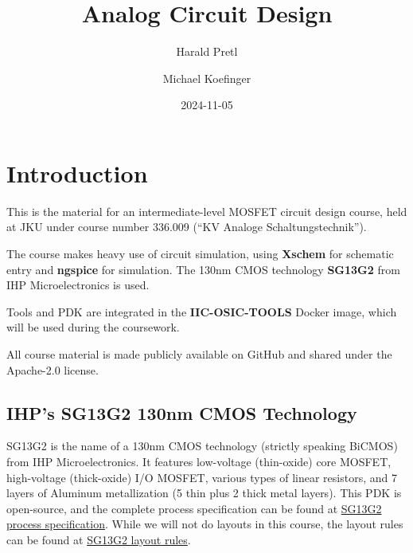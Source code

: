 \documentclass[
  a4paper,
  DIV=11,
  numbers=noendperiod]{scrartcl}
\title{Analog Circuit Design}
\author{Harald Pretl \and Michael Koefinger}
\date{2024-11-05}
\renewcommand*\contentsname{Table of contents}
\newcommand\contentsname{Table of contents}
\begin{document}
\maketitle

\renewcommand*\contentsname{Table of contents}
{
\hypersetup{linkcolor=}
\setcounter{tocdepth}{3}
\tableofcontents
}

\section{Introduction}\label{sec-intro}

This is the material for an intermediate-level MOSFET circuit design
course, held at JKU under course number 336.009 (``KV Analoge
Schaltungstechnik'').

The course makes heavy use of circuit simulation, using \textbf{Xschem}
for schematic entry and \textbf{ngspice} for simulation. The 130nm CMOS
technology \textbf{SG13G2} from IHP Microelectronics is used.

Tools and PDK are integrated in the \textbf{IIC-OSIC-TOOLS} Docker
image, which will be used during the coursework.

\begin{tcolorbox}[enhanced jigsaw, titlerule=0mm, left=2mm, coltitle=black, toprule=.15mm, breakable, opacitybacktitle=0.6, colframe=quarto-callout-important-color-frame, bottomtitle=1mm, toptitle=1mm, opacityback=0, colbacktitle=quarto-callout-important-color!10!white, title=\textcolor{quarto-callout-important-color}{\faExclamation}\hspace{0.5em}{Important}, arc=.35mm, rightrule=.15mm, colback=white, bottomrule=.15mm, leftrule=.75mm]

All course material is made publicly available on GitHub and shared
under the Apache-2.0 license.

\end{tcolorbox}

\subsection{IHP's SG13G2 130nm CMOS
Technology}\label{ihps-sg13g2-130nm-cmos-technology}

SG13G2 is the name of a 130nm CMOS technology (strictly speaking BiCMOS)
from IHP Microelectronics. It features low-voltage (thin-oxide) core
MOSFET, high-voltage (thick-oxide) I/O MOSFET, various types of linear
resistors, and 7 layers of Aluminum metallization (5 thin plus 2 thick
metal layers). This PDK is open-source, and the complete process
specification can be found at
\href{https://github.com/IHP-GmbH/IHP-Open-PDK/blob/main/ihp-sg13g2/libs.doc/doc/SG13G2_os_process_spec.pdf}{SG13G2
process specification}. While we will not do layouts in this course, the
layout rules can be found at
\href{https://github.com/IHP-GmbH/IHP-Open-PDK/blob/main/ihp-sg13g2/libs.doc/doc/SG13G2_os_layout_rules.pdf}{SG13G2
layout rules}.
\end{document}
